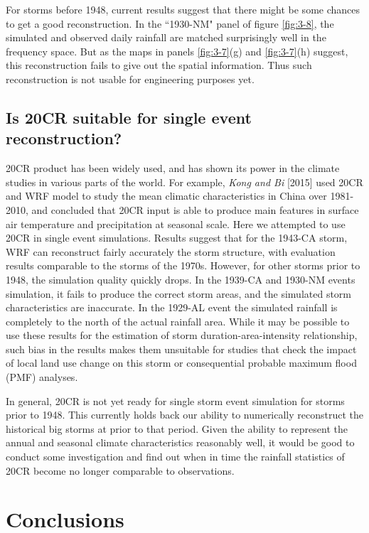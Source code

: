 For storms before 1948, current results suggest that there might be some chances to get a good reconstruction. In the ``1930-NM" panel of figure \ref{fig:3-8}, the simulated and observed daily rainfall are matched surprisingly well in the frequency space. But as the maps in panels \ref{fig:3-7}(g) and \ref{fig:3-7}(h) suggest, this reconstruction fails to give out the spatial information. Thus such reconstruction is not usable for engineering purposes yet.

\subsection{Is 20CR suitable for single event reconstruction?}

20CR product has been widely used, and has shown its power in the climate studies in various parts of the world. For example, \textit{Kong and Bi} [2015] used 20CR and WRF model to study the mean climatic characteristics in China over 1981-2010, and concluded that 20CR input is able to produce main features in surface air temperature and precipitation at seasonal scale. Here we attempted to use 20CR in single event simulations. Results suggest that for the 1943-CA storm, WRF can reconstruct fairly accurately the storm structure, with evaluation results comparable to the storms of the 1970s. However, for other storms prior to 1948, the simulation quality quickly drops. In the 1939-CA and 1930-NM events simulation, it fails to produce the correct storm areas, and the simulated storm characteristics are inaccurate. In the 1929-AL event the simulated rainfall is completely to the north of the actual rainfall area. While it may be possible to use these results for the estimation of storm duration-area-intensity relationship, such bias in the results makes them unsuitable for studies that check the impact of local land use change on this storm or consequential probable maximum flood (PMF) analyses.

In general, 20CR is not yet ready for single storm event simulation for storms prior to 1948. This currently holds back our ability to numerically reconstruct the historical big storms at prior to that period. Given the ability to represent the annual and seasonal climate characteristics reasonably well, it would be good to conduct some investigation and find out when in time the rainfall statistics of 20CR become no longer comparable to observations.


\section{Conclusions}

